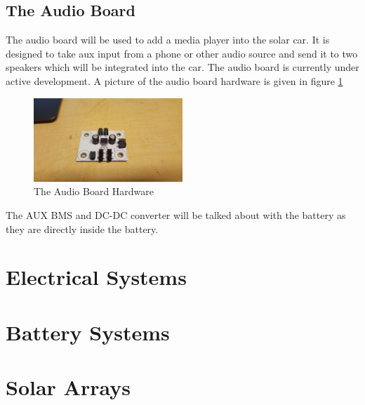 \documentclass[titlepage]{article}
\begin{document}
    \subsection{The Audio Board}
    The audio board will be used to add a media player into the solar
    car. It is designed to take aux input from a phone or other audio
    source and send it to two speakers which will be integrated into the
    car. The audio board is currently under active development. A
    picture of the audio board hardware is given in figure
    \ref{fig:audio}
    \begin{figure}[H]
        \centering
        \includegraphics[width=0.5\textwidth]{images/audio_board.jpg}
        \caption{The Audio Board Hardware}
        \label{fig:audio}
    \end{figure}
    The AUX BMS and DC-DC converter will be talked about with the
    battery as they are directly inside the battery.
    \section{Electrical Systems}
    \section{Battery Systems}
    \section{Solar Arrays}
\end{document}
